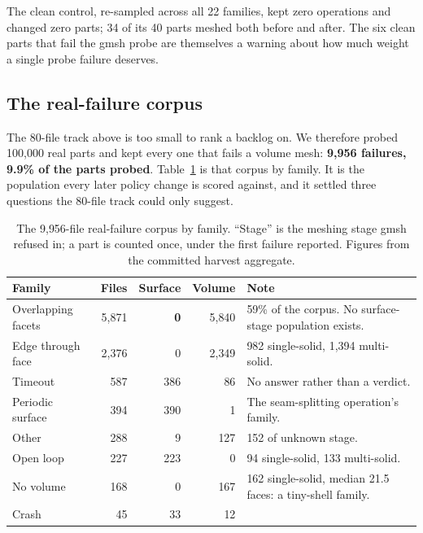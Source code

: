 \documentclass[11pt,onecolumn]{article}
\begin{document}
The clean control, re-sampled across all 22 families, kept zero operations and changed zero parts;
34 of its 40 parts meshed both before and after. The six clean parts that fail the gmsh probe are
themselves a warning about how much weight a single probe failure deserves.

\subsection{The real-failure corpus}\label{sec:corpus}

The 80-file track above is too small to rank a backlog on. We therefore probed 100{,}000 real parts
and kept every one that fails a volume mesh: \textbf{9{,}956 failures, 9.9\% of the parts probed}.
Table~\ref{tab:corpus} is that corpus by family. It is the population every later policy change is
scored against, and it settled three questions the 80-file track could only suggest.

\begin{table}[h]
\centering
\caption{The 9{,}956-file real-failure corpus by family. ``Stage'' is the meshing stage gmsh
refused in; a part is counted once, under the first failure reported. Figures from the committed
harvest aggregate.}
\label{tab:corpus}
\footnotesize
\begin{tabularx}{\textwidth}{@{}l r r r X@{}}
\toprule
\textbf{Family} & \textbf{Files} & \textbf{Surface} & \textbf{Volume} & \textbf{Note}\\
\midrule
Overlapping facets  & 5{,}871 & \textbf{0} & 5{,}840 & 59\% of the corpus. No surface-stage population exists.\\
Edge through face   & 2{,}376 & 0 & 2{,}349 & 982 single-solid, 1{,}394 multi-solid.\\
Timeout             & 587 & 386 & 86 & No answer rather than a verdict.\\
Periodic surface    & 394 & 390 & 1 & The seam-splitting operation's family.\\
Other               & 288 & 9 & 127 & 152 of unknown stage.\\
Open loop           & 227 & 223 & 0 & 94 single-solid, 133 multi-solid.\\
No volume           & 168 & 0 & 167 & 162 single-solid, median 21.5 faces: a tiny-shell family.\\
Crash               & 45 & 33 & 12 & \\
\bottomrule
\end{tabularx}
\end{table}
\end{document}
